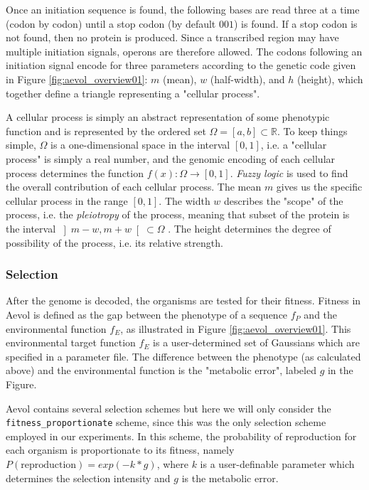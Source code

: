 Once an initiation sequence is found, the following bases are read three at a time (codon by codon) until a stop codon (by default $001$) is found. If a stop codon is not found, then no protein is produced. Since a transcribed region may have multiple initiation signals, operons are therefore allowed. The codons following an initiation signal encode for three parameters according to the genetic code given in Figure \ref{fig:aevol_overview01}: $m$ (mean), $w$ (half-width), and $h$ (height), which together define a triangle representing a "cellular process".

A cellular process is simply an abstract representation of some phenotypic function and is represented by the ordered set $\Omega = \left[ a,b \right] \subset \mathbb{R}$. To keep things simple, $\Omega$ is a one-dimensional space in the interval $\left[0,1\right]$, i.e. a "cellular process" is simply a real number, and the genomic encoding of each cellular process determines the function $f(x) : \Omega \rightarrow \left[0,1\right]$. \textit{Fuzzy logic} is used to find the overall contribution of each cellular process.  The mean $m$ gives us the specific cellular process in the range $\left[0,1\right]$. The width $w$ describes the "scope" of the process, i.e. the \textit{pleiotropy} of the process, meaning that subset of the protein is the interval $ \left] m - w, m + w\right[ \subset \Omega$ . The height determines the degree of possibility of the process, i.e. its relative strength. 



\subsubsection{Selection}
After the genome is decoded, the organisms are tested for their fitness. Fitness in Aevol is defined as the gap between the phenotype of a sequence $f_P$ and the environmental function $f_E$, as illustrated in Figure \ref{fig:aevol_overview01}. This environmental target function $f_E$ is a user-determined set of Gaussians which are specified in a parameter file. The difference between the phenotype (as calculated above) and the environmental function is the "metabolic error", labeled $g$ in the Figure. 

Aevol contains several selection schemes but here we will only consider the \texttt{fitness\_proportionate} scheme, since this was the only selection scheme employed in our experiments. In this scheme, the probability of reproduction for each organism is proportionate to its fitness, namely $P(\text{reproduction}) = exp(-k * g)$, where $k$ is a user-definable parameter which determines the selection intensity and $g$ is the metabolic error.
